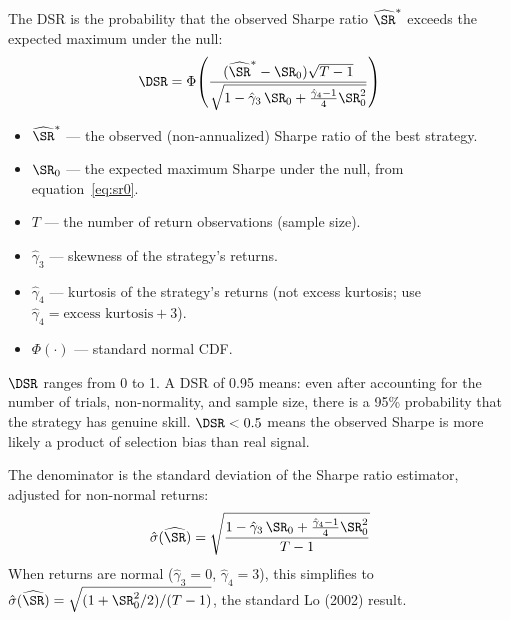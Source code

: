 \begin{definition}
The DSR is the probability that the observed Sharpe ratio $\widehat{\SR}^*$ exceeds the expected maximum under the null:
\begin{equation}
\DSR = \Phi\!\left( \frac{(\widehat{\SR}^* - \SR_0)\sqrt{T - 1}}{\sqrt{1 - \hat{\gamma}_3 \, \SR_0 + \frac{\hat{\gamma}_4 - 1}{4}\SR_0^2}} \right)
\label{eq:dsr}
\end{equation}
\begin{itemize}[nosep]
  \item $\widehat{\SR}^*$ --- the observed (non-annualized) Sharpe ratio of the best strategy.
  \item $\SR_0$ --- the expected maximum Sharpe under the null, from equation~\eqref{eq:sr0}.
  \item $T$ --- the number of return observations (sample size).
  \item $\hat{\gamma}_3$ --- skewness of the strategy's returns.
  \item $\hat{\gamma}_4$ --- kurtosis of the strategy's returns (not excess kurtosis; use $\hat{\gamma}_4 = \text{excess kurtosis} + 3$).
  \item $\Phi(\cdot)$ --- standard normal CDF.
\end{itemize}
$\DSR$ ranges from 0 to 1. A DSR of 0.95 means: even after accounting for the number of trials, non-normality, and sample size, there is a 95\% probability that the strategy has genuine skill. $\DSR < 0.5$ means the observed Sharpe is more likely a product of selection bias than real signal.
\end{definition}

The denominator is the standard deviation of the Sharpe ratio estimator, adjusted for non-normal returns:
\begin{equation}
\hat{\sigma}(\widehat{\SR}) = \sqrt{\frac{1 - \hat{\gamma}_3 \, \SR_0 + \frac{\hat{\gamma}_4 - 1}{4}\SR_0^2}{T - 1}}
\label{eq:sr-se}
\end{equation}
When returns are normal ($\hat{\gamma}_3 = 0$, $\hat{\gamma}_4 = 3$), this simplifies to $\hat{\sigma}(\widehat{\SR}) = \sqrt{(1 + \SR_0^2/2)/(T-1)}$, the standard Lo (2002) result.


